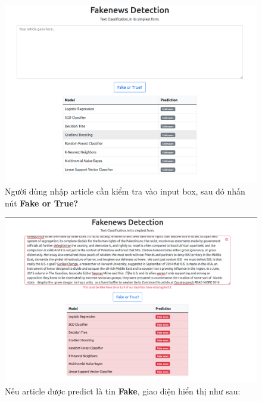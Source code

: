 \documentclass[12pt]{article}
\begin{document}
\begin{figure}[H]
\centering
\includegraphics[scale=.3]{img/homepage.png}
\caption{Người dùng nhập article cần kiểm tra vào input box, sau đó nhấn nút \textbf{Fake or True?}}
\label{fig:homepage}
\end{figure}

\begin{figure}[H]
\centering
\includegraphics[scale=.3]{img/fake-result.png}
\caption{Nếu article được predict là tin \textbf{Fake}, giao diện hiển thị như sau:}
\label{fig:fake-result}
\end{figure}
\end{document}
